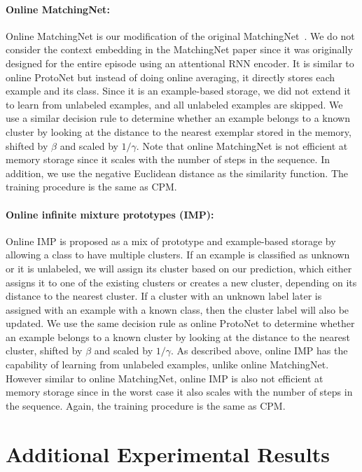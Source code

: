 \paragraph{Online MatchingNet:} Online MatchingNet is our modification of the original
MatchingNet~\citep{matchingnet}. We do not consider the context embedding in the MatchingNet paper
since it was originally designed for the entire episode using an attentional RNN encoder. It is
similar to online ProtoNet but instead of doing online averaging, it directly stores each example
and its class. Since it is an example-based storage, we did not extend it to learn from
unlabeled examples, and all unlabeled examples are skipped. We use a similar decision rule to
determine whether an example belongs to a known cluster by looking at the distance to the nearest
exemplar stored in the memory, shifted by $\beta$ and scaled by $1/\gamma$. Note that online
MatchingNet is not efficient at memory storage since it scales with the number of steps in the
sequence. In addition, we use the negative Euclidean distance as the similarity function. The training
procedure is the same as CPM.

\paragraph{Online infinite mixture prototypes (IMP):} Online IMP is proposed as a mix of prototype and example-based storage by allowing a class to have multiple clusters. If an
example is classified as unknown or it is unlabeled, we will assign its cluster based on our
prediction, which either assigns it to one of the existing clusters or creates a new cluster,
depending on its distance to the nearest cluster. If a cluster with an unknown label later is
assigned with an example with a known class, then the cluster label will also be updated. We use the same
decision rule as online ProtoNet to determine whether an example belongs to a known cluster by
looking at the distance to the nearest cluster, shifted by $\beta$ and scaled by $1/\gamma$. As
described above, online IMP has the capability of learning from unlabeled examples, unlike online
MatchingNet. However similar to online MatchingNet, online IMP is also not efficient at memory
storage since in the worst case it also scales with the number of steps in the sequence. Again, the
training procedure is the same as CPM.

\section{Additional Experimental Results}
\label{sec:additionalresults}
